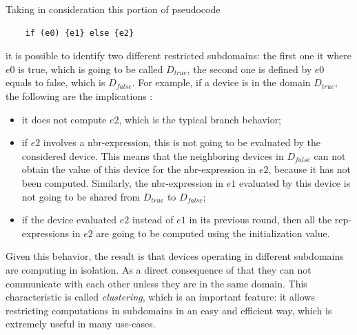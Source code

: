 Taking in consideration this portion of pseudocode
\begin{lstlisting}
    if (e0) {e1} else {e2}
\end{lstlisting}
it is possible to identify two different restricted subdomains: the first one it where $e0$ is true, which is going to be called $D_{true}$, the second one is defined by $e0$ equals to false, which is $D_{false}$.
For example, if a device is in the domain $D_{true}$, the following are the implications \cite{computational_fields_theory}:
\begin{itemize}
    \item it does not compute $e2$, which is the typical branch behavior;
    \item if $e2$ involves a nbr-expression, this is not going to be evaluated by the considered device. This means that the neighboring devices in $D_{false}$ can not obtain the value of this device for the nbr-expression in $e2$, because it has not been computed. Similarly, the nbr-expression in $e1$ evaluated by this device is not going to be shared from $D_{true}$ to $D_{false}$;
    \item if the device evaluated $e2$ instead of $e1$ in its previous round, then all the rep-expressions in $e2$ are going to be computed using the initialization value.
\end{itemize}

Given this behavior, the result is that devices operating in different subdomains are computing in isolation. As a direct consequence of that they can not communicate with each other unless they are in the same domain. This characteristic is called \textit{clustering}, which is an important feature: it allows restricting computations in subdomains in an easy and efficient way, which is extremely useful in many use-cases.

